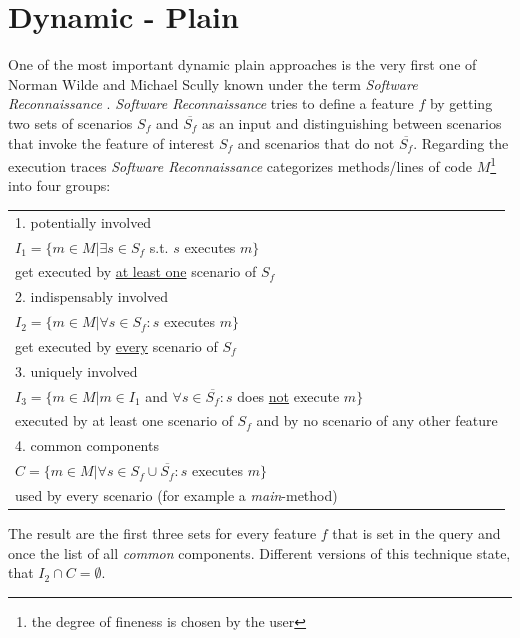 \section{Dynamic - Plain}
\label{sec:Wilde}
One of the most important dynamic plain approaches is the very first one of Norman Wilde and Michael Scully known under the term \emph{Software Reconnaissance} \cite{wilde1995software}. \textit{Software Reconnaissance} tries to define a feature $f$ by getting two sets of scenarios $S_f$ and $\overline{S_f}$ as an input and distinguishing between scenarios that invoke the feature of interest $S_f$ and scenarios that do not $\overline{S_f}$. \newline
Regarding the execution traces \textit{Software Reconnaissance} categorizes methods/lines of code $M$\footnote{the degree of fineness is chosen by the user} into four groups:
\begin{table}[h]
	\begin{tabular}{l}
		1. potentially involved  \\
 		\qquad $I_1 = \{ m \in M | \exists s \in S_f$ s.t. $s$ executes $m \}$ \\
 		\qquad get executed by \underline{at least one} scenario of $S_f$\\
		2. indispensably involved  \\
		\qquad $I_2 = \{ m \in M | \forall s \in S_f : s$ executes $m \}$ \\
		\qquad get executed by \underline{every} scenario of $S_f$\\
		3. uniquely involved  \\
		\qquad $I_3 = \{ m \in M | m \in I_1$ and $\forall s\in \overline{S_f} : s$ does \underline{not} execute $m \}$ \\
		\qquad executed by at least one scenario of $S_f$ and by no scenario of any other feature\\
		4. common components  \\
		\qquad $C = \{ m \in M | \forall s \in S_f \cup \overline{S_f}:s$ executes $m \}$ \\
		\qquad used by every scenario (for example a \textit{main}-method)
	\end{tabular}
\end{table} \newline
The result are the first three sets for every feature $f$ that is set in the query and once the list of all \textit{common} components. Different versions of this technique state, that $I_2 \cap C = \emptyset$.\cite{wilde1995software} \newline
